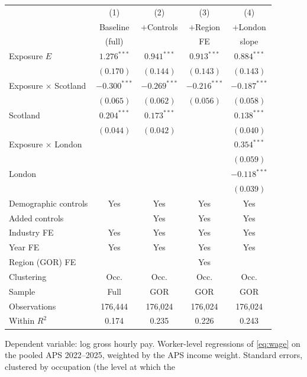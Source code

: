 \begin{threeparttable}
\small
\setlength{\tabcolsep}{5pt}
\renewcommand{\arraystretch}{1.05}
\begin{tabular}{l cccc}
\toprule
 & (1) & (2) & (3) & (4) \\
 & Baseline & $+$Controls & $+$Region & $+$London \\
 & (full) &  & FE & slope \\
\midrule
Exposure $E$ & $1.276^{***}$ & $0.941^{***}$ & $0.913^{***}$ & $0.884^{***}$ \\
 & $(0.170)$ & $(0.144)$ & $(0.143)$ & $(0.143)$ \\
\addlinespace[2pt]
Exposure $\times$ Scotland & $-0.300^{***}$ & $-0.269^{***}$ & $-0.216^{***}$ & $-0.187^{***}$ \\
 & $(0.065)$ & $(0.062)$ & $(0.056)$ & $(0.058)$ \\
\addlinespace[2pt]
Scotland & $0.204^{***}$ & $0.173^{***}$ &  & $0.138^{***}$ \\
 & $(0.044)$ & $(0.042)$ &  & $(0.040)$ \\
\addlinespace[2pt]
Exposure $\times$ London &  &  &  & $0.354^{***}$ \\
 &  &  &  & $(0.059)$ \\
\addlinespace[2pt]
London &  &  &  & $-0.118^{***}$ \\
 &  &  &  & $(0.039)$ \\
\addlinespace[2pt]
\midrule
Demographic controls\tnote{a} & Yes & Yes & Yes & Yes \\
Added controls\tnote{b} &  & Yes & Yes & Yes \\
Industry FE & Yes & Yes & Yes & Yes \\
Year FE & Yes & Yes & Yes & Yes \\
Region (GOR) FE &  &  & Yes &  \\
Clustering & Occ. & Occ. & Occ. & Occ. \\
Sample & Full & GOR & GOR & GOR \\
\addlinespace[2pt]
Observations & 176,444 & 176,024 & 176,024 & 176,024 \\
Within $R^2$ & 0.174 & 0.235 & 0.226 & 0.243 \\
\bottomrule
\end{tabular}
\begin{tablenotes}[flushleft]
\footnotesize
\item Dependent variable: log gross hourly pay. Worker-level regressions
of \cref{eq:wage} on the pooled APS 2022--2025, weighted by the APS income
weight. Standard errors, clustered by occupation (the level at which the

\end{tablenotes}
\end{threeparttable}
